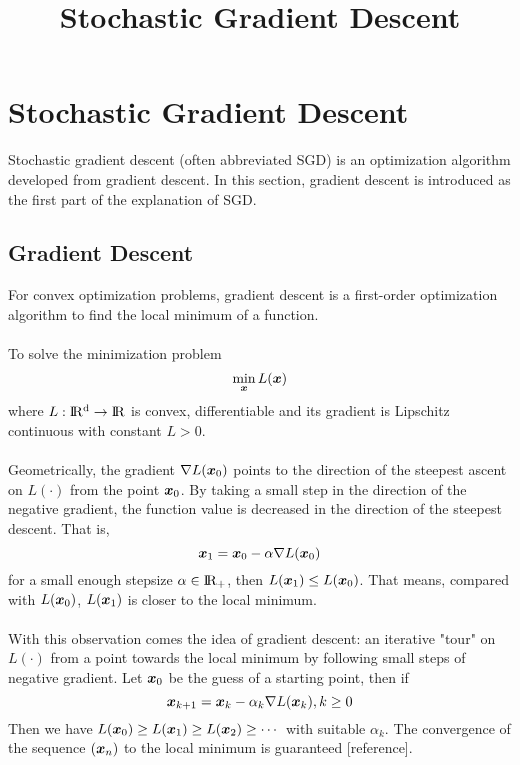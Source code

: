 \documentclass[11pt]{article}
\title{Stochastic Gradient Descent}
\begin{document}
\maketitle

\section{Stochastic Gradient Descent}

    Stochastic gradient descent (often abbreviated SGD) is an optimization algorithm developed from gradient descent. 
    In this section, gradient descent is introduced as the first part of the explanation of SGD.

    \subsection{Gradient Descent}
        For convex optimization problems, gradient descent is a first-order optimization algorithm 
        to find the local minimum of a function.
        \\\\
        To solve the minimization problem 
        $$ 
        \min_{\bm{x}} L(\bm{x}) 
        $$
        where $ L : \rm I\!R^d \to \rm I\!R$ is convex, differentiable and its gradient is Lipschitz continuous with constant
        $ L > 0$.
        \\\\
        Geometrically, the gradient $\nabla L(\bm{x}_0)$ points to the direction of the steepest ascent on $L(\cdot)$ 
        from the point $\bm{x}_0$. 
        By taking a small step in the direction of the negative gradient, the function value is decreased in the 
        direction of the steepest descent. That is,
        $$ 
        \bm{x}_1  = \bm{x}_0 - \alpha \nabla L(\bm{x}_0)
        $$
        for a small enough stepsize $\alpha \in \rm I\!R_{+}$, then $L(\bm{x}_1) \leq L(\bm{x}_0)$. 
        That means, compared with $L(\bm{x}_0)$, $L(\bm{x}_1)$ is closer to the local minimum.
        \\\\
        With this observation comes the idea of gradient descent: an iterative "tour" on $L(\cdot)$ from a point towards the 
        local minimum by following small steps of negative gradient. 
        Let $\bm{x}_0$ be the guess of a starting point, then if
        $$
        \bm{x}_{k+1} = \bm{x}_{k} - \alpha_k \nabla L(\bm{x}_k), k \geq 0
        $$
        Then we have $ L(\bm{x}_0) \geq L(\bm{x}_1) \geq L(\bm{x}_2) \geq \cdots$ with suitable $\alpha_k$. The convergence of the 
        sequence $(\bm{x}_n)$ to the local minimum is guaranteed{\color{red} [reference]}.
\end{document}
